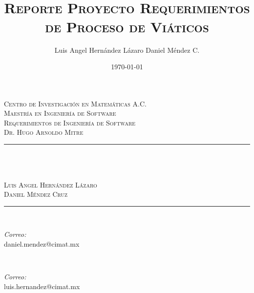 \documentclass{report}
\title{\textsc{Reporte Proyecto Requerimientos de Proceso de Viáticos}}
\author{Luis Angel Hernández Lázaro  Daniel Méndez C.\\ }
\date{\today}
\makeatletter
\let\thetitle\@title
\makeatother
\begin{document}

\begin{titlepage}
	\centering
    \vspace*{0.5 cm}
    
    
    \begin{figure}
		\centering
	\end{figure}
    \textsc{\LARGE Centro de Investigación en Matemáticas A.C.}\\[1.0 cm]
	\textsc{\Large Maestría en Ingeniería de Software}\\[0.5 cm]
	\textsc{\large Requerimientos de Ingeniería de Software\\Dr. Hugo Arnoldo Mitre}\\[0.5 cm]
	\rule{\linewidth}{0.2 mm} \\[0.4 cm]
	{ \huge \bfseries \thetitle}\\ \textsc{\large \\ Luis Angel Hernández Lázaro \\ Daniel Méndez Cruz}
	\rule{\linewidth}{0.2 mm} \\[1.5 cm]
	
	\begin{minipage}{0.5\textwidth}
		\begin{flushleft} \large
			\emph{Correo:}\\
			daniel.mendez@cimat.mx
		\end{flushleft}
	\end{minipage}~
	\begin{minipage}{0.4\textwidth}
		\begin{flushright} \large
			\emph{Correo:} \\
			luis.hernandez@cimat.mx
		\end{flushright}
	\end{minipage}\\[2 cm]
		

\end{titlepage}
\end{document}
